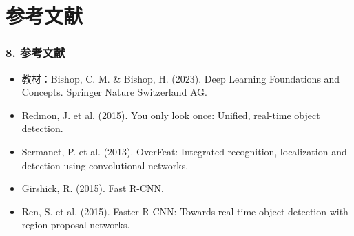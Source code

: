 \documentclass[t,aspectratio=169]{beamer} %
\begin{document}
\section{参考文献}

\begin{frame}
    \frametitle{8. 参考文献}
    \begin{itemize}
        \item 教材：Bishop, C. M. \& Bishop, H. (2023). Deep Learning Foundations and Concepts. Springer Nature Switzerland AG.
        \item Redmon, J. et al. (2015). You only look once: Unified, real-time object detection.
        \item Sermanet, P. et al. (2013). OverFeat: Integrated recognition, localization and detection using convolutional networks.
        \item Girshick, R. (2015). Fast R-CNN.
        \item Ren, S. et al. (2015). Faster R-CNN: Towards real-time object detection with region proposal networks.
    \end{itemize}
\end{frame}
\end{document}
